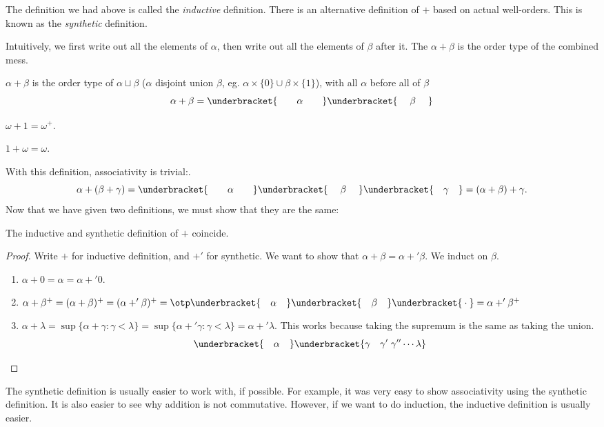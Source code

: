 \documentclass[a4paper]{article}
\begin{document}
The definition we had above is called the \emph{inductive} definition. There is an alternative definition of $+$ based on actual well-orders. This is known as the \emph{synthetic} definition.

Intuitively, we first write out all the elements of $\alpha$, then write out all the elements of $\beta$ after it. The $\alpha + \beta$ is the order type of the combined mess.

\begin{defi}
  $\alpha + \beta$ is the order type of $\alpha \sqcup \beta$ ($\alpha$ disjoint union $\beta$, eg. $\alpha\times \{0\}\cup \beta\times \{1\}$), with all $\alpha$ before all of $\beta$
  \[
    \alpha + \beta = \underbracket{\quad\quad\vphantom{\beta}\alpha\vphantom{\beta}\quad\quad}\underbracket{\quad\;\beta\;\quad}
  \]
\end{defi}
\begin{eg}
  $\omega + 1 = \omega^+$.

  $1 + \omega = \omega$.
\end{eg}

With this definition, associativity is trivial:.
\[
  \alpha + (\beta + \gamma) = \underbracket{\quad\quad\vphantom{\beta}\alpha\vphantom{\beta}\quad\quad}\underbracket{\quad\;\beta\;\quad}\underbracket{\quad\gamma\quad} = (\alpha + \beta) + \gamma.
\]
Now that we have given two definitions, we must show that they are the same:
\begin{prop}
  The inductive and synthetic definition of $+$ coincide.
\end{prop}

\begin{proof}
  Write $+$ for inductive definition, and $+'$ for synthetic. We want to show that $\alpha + \beta = \alpha +' \beta$. We induct on $\beta$.

  \begin{enumerate}
    \item $\alpha + 0 = \alpha = \alpha +' 0$.
    \item $\alpha + \beta^+ = (\alpha + \beta)^+ = (\alpha +' \beta)^+ = \otp\underbracket{\quad\vphantom\beta\alpha\vphantom\beta\quad}\underbracket{\quad\beta\quad}\underbracket{\vphantom\beta\cdot\vphantom\beta} = \alpha +' \beta^+$
    \item $\alpha + \lambda = \sup\{\alpha + \gamma: \gamma < \lambda\} = \sup \{\alpha +' \gamma: \gamma < \lambda\} = \alpha +' \lambda$. This works because taking the supremum is the same as taking the union.
      \[
        \underbracket{\quad\vphantom\gamma\alpha\vphantom\gamma\quad}\underbracket{\gamma\quad\gamma'\;\gamma''\cdots \lambda}
      \]
  \end{enumerate}
\end{proof}
The synthetic definition is usually easier to work with, if possible. For example, it was very easy to show associativity using the synthetic definition. It is also easier to see why addition is not commutative. However, if we want to do induction, the inductive definition is usually easier.
\end{document}
